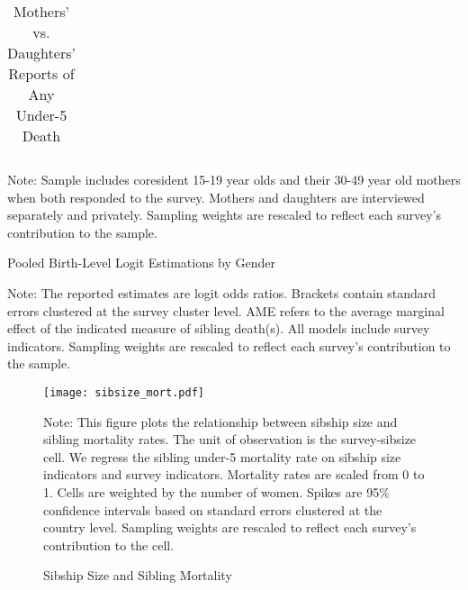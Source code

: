 \documentclass[12pt,english]{article}
\begin{document}
\begin{table}
\begin{center}
\caption{Mothers' vs. Daughters' Reports of Any Under-5 Death}
\label{table:daughter_vs_mom_count}

\begin{tabular}{l*{9}{c}}
\toprule

\bottomrule
\end{tabular}
\end{center}
\footnotesize{Note: Sample includes coresident 15-19 year olds and their 30-49 year old mothers when both responded to the survey. Mothers and daughters are interviewed separately and privately. Sampling weights are rescaled to reflect each survey's contribution to the sample.}
\end{table}

\begin{table}
\begin{center}
\caption{Pooled Birth-Level Logit Estimations by Gender}
\label{table:main_bygender}

\end{center}
\footnotesize{Note: The reported estimates are logit odds ratios. Brackets contain standard errors clustered at the survey cluster level. AME refers to the average marginal effect of the indicated measure of sibling death(s). All models include survey indicators. Sampling weights are rescaled to reflect each survey's contribution to the sample.}
\end{table}

\renewcommand\thefigure{A.\arabic{figure}}    
\setcounter{figure}{0}

\begin{figure}
    \caption{Sibship Size and Sibling Mortality}
    \label{figure:sibsizemort}
    \begin{center}
    \texttt{[image: sibsize\_mort.pdf]}
    \end{center}
\footnotesize{Note: This figure plots the relationship between sibship size and sibling mortality rates. The unit of observation is the survey-sibsize cell. We regress the sibling under-5 mortality rate on sibship size indicators and survey indicators. Mortality rates are scaled from 0 to 1. Cells are weighted by the number of women. Spikes are 95\% confidence intervals based on standard errors clustered at the country level. Sampling weights are rescaled to reflect each survey's contribution to the cell.}
\end{figure}
\end{document}
